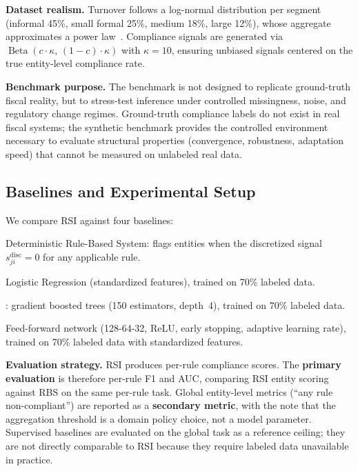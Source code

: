 \documentclass[letterpaper]{article}
\begin{document}
\noindent\textbf{Dataset realism.} Turnover follows a log-normal
distribution per segment (informal 45\%, small formal 25\%, medium
18\%, large 12\%), whose aggregate approximates a power
law~\citep{gabaix2009power}. Compliance signals are generated via
$\operatorname{Beta}(c \cdot \kappa,\, (1{-}c) \cdot \kappa)$ with
$\kappa=10$, ensuring unbiased signals centered on the true
entity-level compliance rate.

\noindent\textbf{Benchmark purpose.} The benchmark is not designed to
replicate ground-truth fiscal reality, but to stress-test inference
under controlled missingness, noise, and regulatory change regimes.
Ground-truth compliance labels do not exist in real fiscal systems;
the synthetic benchmark provides the controlled environment necessary
to evaluate structural properties (convergence, robustness, adaptation
speed) that cannot be measured on unlabeled real data.

\subsection{Baselines and Experimental Setup}

We compare RSI against four baselines:

\begin{description}[leftmargin=1.5em]
  \item[RBS] Deterministic Rule-Based System: flags entities when
        the discretized signal $s_{ji}^{\mathrm{disc}} = 0$ for any
        applicable rule.
  \item[LR$^\dagger$] Logistic Regression (standardized features),
        trained on 70\% labeled data.
  \item[XGBoost$^\dagger$] \citep{chen2016xgboost}: gradient boosted
        trees (150 estimators, depth~4), trained on 70\% labeled data.
  \item[MLP$^\dagger$] Feed-forward network (128-64-32, ReLU, early
        stopping, adaptive learning rate), trained on 70\% labeled data
        with standardized features.
\end{description}

\noindent\textbf{Evaluation strategy.} RSI produces per-rule compliance
scores. The \textbf{primary evaluation} is therefore per-rule F1 and
AUC, comparing RSI entity scoring against RBS on the same per-rule
task. Global entity-level metrics (``any rule non-compliant'') are
reported as a \textbf{secondary metric}, with the note that the
aggregation threshold is a domain policy choice, not a model parameter.
Supervised baselines are evaluated on the global task as a reference
ceiling; they are not directly comparable to RSI because they require
labeled data unavailable in practice.
\end{document}

